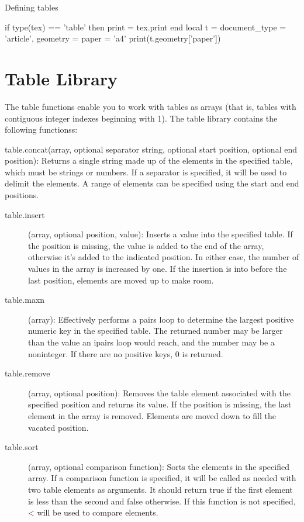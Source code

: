 \begin{texexample}{Defining tables}{}
\begin{luacode}
if type(tex) == 'table' then print = tex.print end
local t = {
    document_type = {'article'},
    geometry = {
       paper = 'a4'
     }
  } 
 print(t.geometry['paper'])
\end{luacode}
\end{texexample}





\chapter{Table Library}

The table functions enable you to work with tables as arrays (that is, tables with contiguous integer indexes beginning with 1). The table library contains the following functionss:

table.concat(array, optional separator string, optional start position, optional end position):
Returns a single string made up of the elements in the specified table, which must be strings or
numbers. If a separator is specified, it will be used to delimit the elements. A range of elements
can be specified using the start and end positions.

\begin{description}
\item[table.insert] (array, optional position, value): Inserts a value into the specified table. If the position is missing, the value is added to the end of the array, otherwise it’s added to the indicated
position. In either case, the number of values in the array is increased by one. If the insertion is
into before the last position, elements are moved up to make room.

\item[table.maxn] (array): Effectively performs a pairs loop to determine the largest positive
numeric key in the specified table. The returned number may be larger than the value an
ipairs loop would reach, and the number may be a noninteger. If there are no positive keys,
0 is returned.

\item[table.remove] (array, optional position): Removes the table element associated with the specified position and returns its value. If the position is missing, the last element in the array is
removed. Elements are moved down to fill the vacated position.

\item[table.sort] (array, optional comparison function): Sorts the elements in the specified array. If a
comparison function is specified, it will be called as needed with two table elements as arguments. It should return true if the first element is less than the second and false otherwise.
If this function is not specified, < will be used to compare elements.
\end{description}

